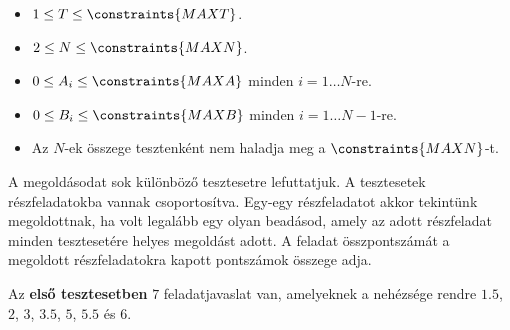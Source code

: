 \Constraints
\begin{itemize}[nolistsep, itemsep=2mm]
    \item $1 \le T \le \constraints{MAXT}$.
	\item $2 \le N \le \constraints{MAXN}$.
	\item $0 \le A_i \le \constraints{MAXA}$ minden $i=1 \ldots N$-re.
	\item $0 \le B_i \le \constraints{MAXB}$ minden $i=1 \ldots N-1$-re.
    \item Az $N$-ek összege tesztenként nem haladja meg a $\constraints{MAXN}$-t.
\end{itemize}

\Scoring
A megoldásodat sok különböző tesztesetre lefuttatjuk. A tesztesetek részfeladatokba vannak csoportosítva. Egy-egy részfeladatot akkor tekintünk megoldottnak, ha volt legalább egy olyan beadásod, amely az adott részfeladat minden tesztesetére helyes megoldást adott.
A feladat összpontszámát a megoldott részfeladatokra kapott pontszámok összege adja.








\Examples
\begin{example}
%
\end{example}


\Explanation

Az \textbf{első tesztesetben} $7$ feladatjavaslat van, amelyeknek a nehézsége rendre $1.5$, $2$, $3$, $3.5$, $5$, $5.5$ és $6$.

